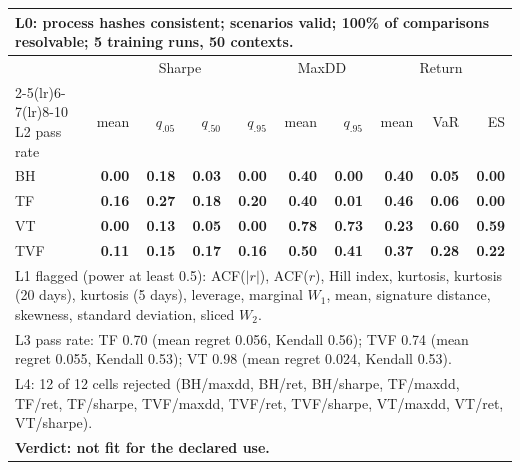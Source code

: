 \begin{tabular}{lrrrrrrrrr}
\toprule
\multicolumn{10}{p{13.5cm}}{L0: process hashes consistent; scenarios valid; 100\% of comparisons resolvable; 5 training runs, 50 contexts.} \\
\midrule
 & \multicolumn{4}{c}{Sharpe} & \multicolumn{2}{c}{MaxDD} & \multicolumn{3}{c}{Return} \\
\cmidrule(lr){2-5}\cmidrule(lr){6-7}\cmidrule(lr){8-10}
L2 pass rate & mean & $q_{.05}$ & $q_{.50}$ & $q_{.95}$ & mean & $q_{.95}$ & mean & VaR & ES \\
\midrule
BH & \textbf{0.00} & \textbf{0.18} & \textbf{0.03} & \textbf{0.00} & \textbf{0.40} & \textbf{0.00} & \textbf{0.40} & \textbf{0.05} & \textbf{0.00} \\
TF & \textbf{0.16} & \textbf{0.27} & \textbf{0.18} & \textbf{0.20} & \textbf{0.40} & \textbf{0.01} & \textbf{0.46} & \textbf{0.06} & \textbf{0.00} \\
VT & \textbf{0.00} & \textbf{0.13} & \textbf{0.05} & \textbf{0.00} & \textbf{0.78} & \textbf{0.73} & \textbf{0.23} & \textbf{0.60} & \textbf{0.59} \\
TVF & \textbf{0.11} & \textbf{0.15} & \textbf{0.17} & \textbf{0.16} & \textbf{0.50} & \textbf{0.41} & \textbf{0.37} & \textbf{0.28} & \textbf{0.22} \\
\midrule
\multicolumn{10}{p{13.5cm}}{L1 flagged (power at least 0.5): ACF($|r|$), ACF($r$), Hill index, kurtosis, kurtosis (20 days), kurtosis (5 days), leverage, marginal $W_1$, mean, signature distance, skewness, standard deviation, sliced $W_2$.} \\
\multicolumn{10}{p{13.5cm}}{L3 pass rate: TF 0.70 (mean regret 0.056, Kendall 0.56); TVF 0.74 (mean regret 0.055, Kendall 0.53); VT 0.98 (mean regret 0.024, Kendall 0.53).} \\
\multicolumn{10}{p{13.5cm}}{L4: 12 of 12 cells rejected (BH/maxdd, BH/ret, BH/sharpe, TF/maxdd, TF/ret, TF/sharpe, TVF/maxdd, TVF/ret, TVF/sharpe, VT/maxdd, VT/ret, VT/sharpe).} \\
\multicolumn{10}{p{13.5cm}}{\textbf{Verdict: not fit for the declared use.}} \\
\bottomrule
\end{tabular}
